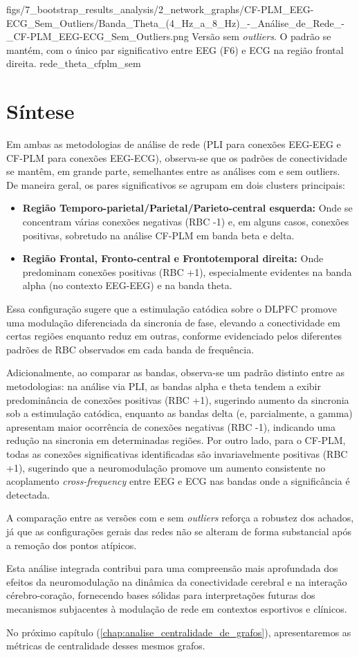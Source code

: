 \smallfigure
{figs/7_bootstrap_results_analysis/2_network_graphs/CF-PLM_EEG-ECG_Sem_Outliers/Banda_Theta_(4_Hz_a_8_Hz)_-_Análise_de_Rede_-_CF-PLM_EEG-ECG_Sem_Outliers.png}
{Versão sem \textit{outliers}. O padrão se mantém, com o único par significativo entre EEG (F6) e ECG na região frontal direita.}
{rede_theta_cfplm_sem}


\section{Síntese}
Em ambas as metodologias de análise de rede (PLI para conexões EEG-EEG e CF-PLM para conexões EEG-ECG), observa-se que os padrões de conectividade se mantêm, em grande parte, semelhantes entre as análises com e sem outliers. De maneira geral, os pares significativos se agrupam em dois clusters principais: 
\begin{itemize}
    \item \textbf{Região Temporo-parietal/Parietal/Parieto-central esquerda:} Onde se concentram várias conexões negativas (RBC -1) e, em alguns casos, conexões positivas, sobretudo na análise CF-PLM em banda beta e delta.
    \item \textbf{Região Frontal, Fronto-central e Frontotemporal direita:} Onde predominam conexões positivas (RBC +1), especialmente evidentes na banda alpha (no contexto EEG-EEG) e na banda theta.
\end{itemize}

Essa configuração sugere que a estimulação catódica sobre o DLPFC promove uma modulação diferenciada da sincronia de fase, elevando a conectividade em certas regiões enquanto reduz em outras, conforme evidenciado pelos diferentes padrões de RBC observados em cada banda de frequência.

Adicionalmente, ao comparar as bandas, observa-se um padrão distinto entre as metodologias: na análise via PLI, as bandas alpha e theta tendem a exibir predominância de conexões positivas (RBC +1), sugerindo aumento da sincronia sob a estimulação catódica, enquanto as bandas delta (e, parcialmente, a gamma) apresentam maior ocorrência de conexões negativas (RBC -1), indicando uma redução na sincronia em determinadas regiões. Por outro lado, para o CF-PLM, todas as conexões significativas identificadas são invariavelmente positivas (RBC +1), sugerindo que a neuromodulação promove um aumento consistente no acoplamento \textit{cross-frequency} entre EEG e ECG nas bandas onde a significância é detectada.

A comparação entre as versões com e sem \textit{outliers} reforça a robustez dos achados, já que as configurações gerais das redes não se alteram de forma substancial após a remoção dos pontos atípicos.

Esta análise integrada contribui para uma compreensão mais aprofundada dos efeitos da neuromodulação na dinâmica da conectividade cerebral e na interação cérebro-coração, fornecendo bases sólidas para interpretações futuras dos mecanismos subjacentes à modulação de rede em contextos esportivos e clínicos.

No próximo capítulo (\ref{chap:analise_centralidade_de_grafos}), apresentaremos as métricas de centralidade desses mesmos grafos.